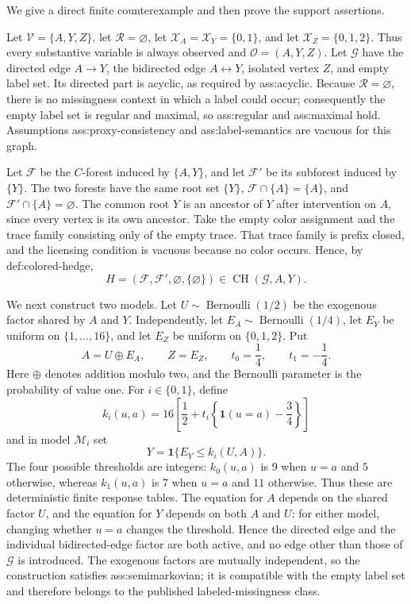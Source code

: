 We give a direct finite counterexample and then prove the support assertions.

Let \(\mathcal V=\{A,Y,Z\}\), let \(\mathcal R=\varnothing\), let \(\mathcal X_A=\mathcal X_Y=\{0,1\}\), and let \(\mathcal X_Z=\{0,1,2\}\).  Thus every substantive variable is always observed and \(\mathcal O=(A,Y,Z)\).  Let \(\mathcal G\) have the directed edge \(A\to Y\), the bidirected edge \(A\leftrightarrow Y\), isolated vertex \(Z\), and empty label set.  Its directed part is acyclic, as required by ass:acyclic.  Because \(\mathcal R=\varnothing\), there is no missingness context in which a label could occur; consequently the empty label set is regular and maximal, so ass:regular and ass:maximal hold.  Assumptions ass:proxy-consistency and ass:label-semantics are vacuous for this graph.

Let \(\mathcal F\) be the \(C\)-forest induced by \(\{A,Y\}\), and let \(\mathcal F'\) be its subforest induced by \(\{Y\}\).  The two forests have the same root set \(\{Y\}\), \(\mathcal F\cap\{A\}=\{A\}\), and \(\mathcal F'\cap\{A\}=\varnothing\).  The common root \(Y\) is an ancestor of \(Y\) after intervention on \(A\), since every vertex is its own ancestor.  Take the empty color assignment and the trace family consisting only of the empty trace.  That trace family is prefix closed, and the licensing condition is vacuous because no color occurs.  Hence, by def:colored-hedge,
\[
 H=(\mathcal F,\mathcal F',\varnothing,\{\varnothing\})
 \in \operatorname{CH}(\mathcal G,A,Y).
\]

We next construct two models.  Let \(U\sim\operatorname{Bernoulli}(1/2)\) be the exogenous factor shared by \(A\) and \(Y\).  Independently, let \(E_A\sim\operatorname{Bernoulli}(1/4)\), let \(E_Y\) be uniform on \(\{1,\ldots,16\}\), and let \(E_Z\) be uniform on \(\{0,1,2\}\).  Put
\[
 A=U\oplus E_A,
 \qquad
 Z=E_Z,
 \qquad
 t_0=\frac14,
 \qquad
 t_1=-\frac14.
\]
Here \(\oplus\) denotes addition modulo two, and the Bernoulli parameter is the probability of value one.
For \(i\in\{0,1\}\), define
\[
 k_i(u,a)
 =16\left[\frac12+t_i\left\{\mathbf 1(u=a)-\frac34\right\}\right]
\]
and in model \(\mathcal M_i\) set
\[
 Y=\mathbf 1\{E_Y\leq k_i(U,A)\}.
\]
The four possible thresholds are integers: \(k_0(u,a)\) is \(9\) when \(u=a\) and \(5\) otherwise, whereas \(k_1(u,a)\) is \(7\) when \(u=a\) and \(11\) otherwise.  Thus these are deterministic finite response tables.  The equation for \(A\) depends on the shared factor \(U\), and the equation for \(Y\) depends on both \(A\) and \(U\): for either model, changing whether \(u=a\) changes the threshold.  Hence the directed edge and the individual bidirected-edge factor are both active, and no edge other than those of \(\mathcal G\) is introduced.  The exogenous factors are mutually independent, so the construction satisfies ass:semimarkovian; it is compatible with the empty label set and therefore belongs to the published labeled-missingness class.

